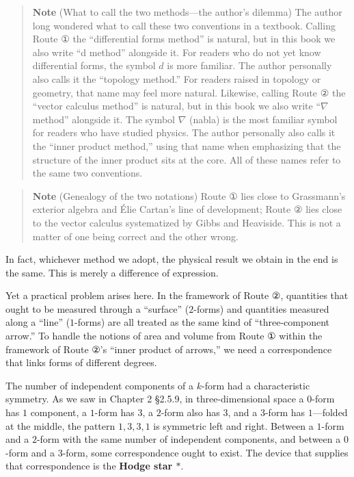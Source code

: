\begin{quote}
\textbf{Note} (What to call the two methods---the author's dilemma) The
author long wondered what to call these two conventions in a textbook.
Calling Route ① the ``differential forms method'' is natural, but in
this book we also write ``d method'' alongside it. For readers who do
not yet know differential forms, the symbol \(d\) is more familiar. The
author personally also calls it the ``topology method.'' For readers
raised in topology or geometry, that name may feel more natural.
Likewise, calling Route ② the ``vector calculus method'' is natural, but
in this book we also write ``\(\nabla\) method'' alongside it. The
symbol \(\nabla\) (nabla) is the most familiar symbol for readers who
have studied physics. The author personally also calls it the ``inner
product method,'' using that name when emphasizing that the structure of
the inner product sits at the core. All of these names refer to the same
two conventions.
\end{quote}

\begin{quote}
\textbf{Note} (Genealogy of the two notations) Route ① lies close to
Grassmann's exterior algebra and Élie Cartan's line of development;
Route ② lies close to the vector calculus systematized by Gibbs and
Heaviside. This is not a matter of one being correct and the other
wrong.
\end{quote}

In fact, whichever method we adopt, the physical result we obtain in the
end is the same. This is merely a difference of expression.

Yet a practical problem arises here. In the framework of Route ②,
quantities that ought to be measured through a ``surface'' (\(2\)-forms)
and quantities measured along a ``line'' (\(1\)-forms) are all treated
as the same kind of ``three-component arrow.'' To handle the notions of
area and volume from Route ① within the framework of Route ②'s ``inner
product of arrows,'' we need a correspondence that links forms of
different degrees.

The number of independent components of a \(k\)-form had a
characteristic symmetry. As we saw in Chapter 2 §2.5.9, in
three-dimensional space a \(0\)-form has \(1\) component, a \(1\)-form
has \(3\), a \(2\)-form also has \(3\), and a \(3\)-form has
\(1\)---folded at the middle, the pattern \(1, 3, 3, 1\) is symmetric
left and right. Between a \(1\)-form and a \(2\)-form with the same
number of independent components, and between a \(0\)-form and a
\(3\)-form, some correspondence ought to exist. The device that supplies
that correspondence is the \textbf{Hodge star $\ast$}.

